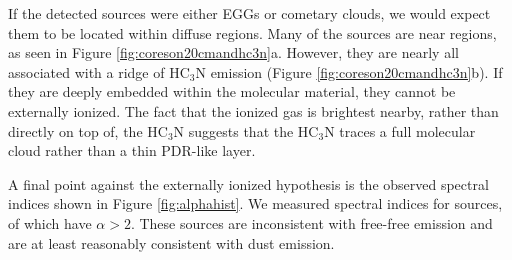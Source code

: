 \documentclass[twocolumn]{aastex61}
\begin{document}
If the detected sources were either EGGs or cometary clouds, we would expect
them to be located within diffuse \hii regions.  Many of the sources are near \hii
regions, as seen in Figure \ref{fig:coreson20cmandhc3n}a.  However, they are
nearly all associated with a ridge of HC$_3$N emission (Figure
\ref{fig:coreson20cmandhc3n}b).  If they are deeply embedded within the
molecular material, they cannot be externally ionized.  
The fact that the ionized gas is brightest nearby, rather than directly on top
of, the HC$_3$N suggests that the HC$_3$N traces a full molecular cloud rather
than a thin PDR-like layer.

A final point against the externally ionized hypothesis is the observed
spectral indices shown in Figure \ref{fig:alphahist}.  We measured spectral
indices for \nalphas sources, of which \ngttwo have $\alpha>2$.  These sources are
inconsistent with free-free emission and are at least reasonably consistent
with dust emission.



% 
% 
\end{document}
